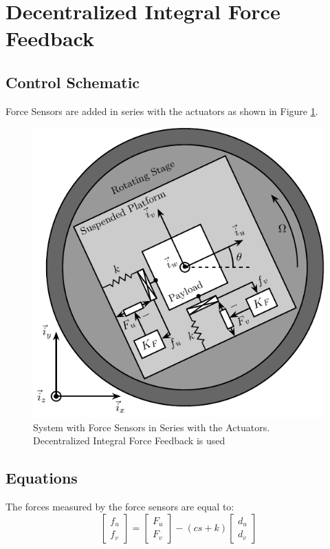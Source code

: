 \documentclass{ISMA_USD2020}
\begin{document}
\section{Decentralized Integral Force Feedback}
\label{sec:orgd957fd6}
\subsection{Control Schematic}
\label{sec:orgc01d8cf}

Force Sensors are added in series with the actuators as shown in Figure \ref{fig:system_iff}.

\begin{figure}[htbp]
\centering
\includegraphics[scale=1]{figs/system_iff.pdf}
\caption{\label{fig:system_iff}System with Force Sensors in Series with the Actuators. Decentralized Integral Force Feedback is used}
\end{figure}

\subsection{Equations}
\label{sec:orge5896ec}
The forces measured by the force sensors are equal to:
\begin{equation}
\label{eq:measured_force}
  \begin{bmatrix} f_{u} \\ f_{v} \end{bmatrix} =
  \begin{bmatrix} F_u \\ F_v \end{bmatrix} - (c s + k)
  \begin{bmatrix} d_u \\ d_v \end{bmatrix}
\end{equation}
\end{document}
